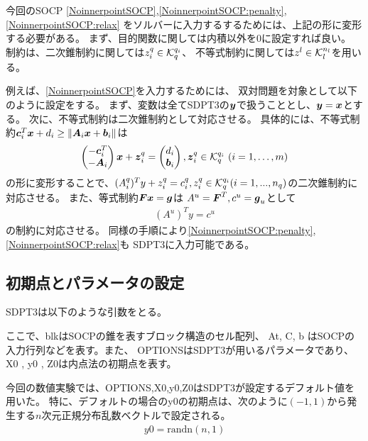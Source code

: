\documentclass[11pt,a4paper,dvipdfmx,titlepage,uplatex]{jsarticle}
\theoremstyle{mystyle}
\newcommand{\0}{\mathbf{0}}
\def\b{\mbox{\boldmath $b$}}
\def\c{\mbox{\boldmath $c$}}
\def\g{\mbox{\boldmath $g$}}
\def\x{\mbox{\boldmath $x$}}
\def\y{\mbox{\boldmath $y$}}
\def\z{\mbox{\boldmath $z$}}
\def\A{\mbox{\boldmath $A$}}
\def\F{\mbox{\boldmath $F$}}
\def\KC{\mbox{$\cal K$}}
\def\Real{\mbox{$\mathbb{R}$}}
\begin{document}
今回のSOCP
\eqref{NoinnerpointSOCP},\eqref{NoinnerpointSOCP:penalty},\eqref{NoinnerpointSOCP:relax}
をソルバーに入力するするためには、上記の形に変形する必要がある。
まず、目的関数に関しては内積以外を$0$に設定すれば良い。
制約は、二次錐制約に関しては$z_i^q \in \KC_q^{q_i}$、
不等式制約に関しては$z^l \in \KC_l^{n_l}$を用いる。%

例えば、\eqref{NoinnerpointSOCP}を入力するためには、
双対問題を対象として以下のように設定をする。
まず、変数は全てSDPT3の$\y$で扱うこととし、$\y = \x$とする。
次に、不等式制約は二次錐制約として対応させる。
具体的には、不等式制約$\c_i^T \x + d_i \ge \|\A_i \x + \b_i\|$は
\begin{align}
  \begin{pmatrix}
    - \c_i^T \\
    - \A_i \\
  \end{pmatrix}
  \x + \z_i^q =
  \begin{pmatrix}
    d_i \\
    \b_i \\
  \end{pmatrix} , \z_i^q \in \KC_q^{q_i} \ (i = 1 , \dots , m)
\end{align}
の形に変形することで、$(A_i^q)^T y + z_i^q = c_i^q, z_i^q \in \KC_q^{q_i} (i = 1,...,n_q)$の二次錐制約に対応させる。
また、等式制約$\F \x = \g$は
$A^u = \F^T , c^u = \g_u$として
\begin{align}
  (A^u)^T y = c^u
\end{align}
の制約に対応させる。
同様の手順により\eqref{NoinnerpointSOCP:penalty},\eqref{NoinnerpointSOCP:relax}も
SDPT3に入力可能である。

\subsection{初期点とパラメータの設定}\label{sec:parameter_settings}

SDPT3は以下のような引数をとる。
\begin{center}
\end{center}
ここで、blkはSOCPの錐を表すブロック構造のセル配列、
At, C, b はSOCPの入力行列などを表す。また、
OPTIONSはSDPT3が用いるパラメータであり、
X0 , y0 , Z0は内点法の初期点を表す。

今回の数値実験では、OPTIONS,X0,y0,Z0はSDPT3が設定するデフォルト値を用いた。
特に、デフォルトの場合のy0の初期点は、次のように$(-1,1)$から発生する$n$次元正規分布乱数ベクトルで設定される。
\begin{align}
  y0 = \text{randn}(n,1)
\end{align}
\end{document}
